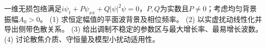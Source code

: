 一维无损包络满足\(i\psi_t+P\psi_{xx}+Q|\psi|^2\psi=0\)，\(P,Q\)为实数且\(P\ne0\)；考虑均匀背景振幅\(A_0>0\)。
(1) 求恒定幅值的平面波背景及相位频率。
(2) 以实虚扰动线性化并导出侧带色散关系。
(3) 给出调制不稳定的参数区与最大增长率、最易增长波数。
(4) 讨论散焦介质、守恒量及模型小扰动适用性。
